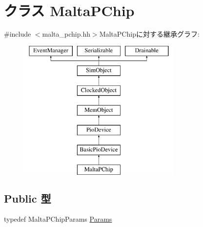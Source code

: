 \hypertarget{classMaltaPChip}{
\section{クラス MaltaPChip}
\label{classMaltaPChip}
}


{\ttfamily \#include $<$malta\_\-pchip.hh$>$}MaltaPChipに対する継承グラフ:\begin{figure}[H]
\begin{center}
\leavevmode
\includegraphics[height=7cm]{classMaltaPChip}
\end{center}
\end{figure}
\subsection*{Public 型}
\begin{DoxyCompactItemize}
\item 
typedef MaltaPChipParams \hyperlink{classMaltaPChip_adcfa4143cf090788abe164c8f54c1a54}{Params}
\end{DoxyCompactItemize}
